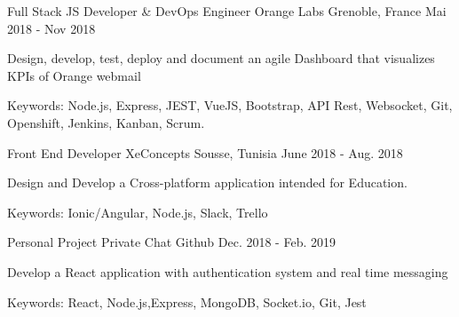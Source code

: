 

\begin{cventries}

  \cventry
    {Full Stack JS Developer \& DevOps Engineer} %
    {Orange Labs} %
    {Grenoble, France} %
    {Mai 2018 - Nov 2018} %
    {
      \begin{cvitems} %
        \item {Design, develop, test, deploy and document an agile Dashboard that visualizes KPIs of Orange webmail}
        \item {Keywords: Node.js, Express, JEST, VueJS, Bootstrap, API Rest, Websocket, Git, Openshift, Jenkins, Kanban, Scrum.}
      \end{cvitems}
    }

  \cventry
    {Front End Developer} %
    {XeConcepts} %
    {Sousse, Tunisia} %
    {June 2018 - Aug. 2018} %
    {
      \begin{cvitems} %
        \item {Design and Develop a Cross-platform application intended for Education.}
        \item {Keywords: Ionic/Angular, Node.js, Slack, Trello}
      \end{cvitems}
    }

  \cventry
    {Personal Project} %
    {Private Chat} %
    {Github} %
    {Dec. 2018 - Feb. 2019} %
    {
      \begin{cvitems} %
        \item {Develop a React application with authentication system and real time messaging   }
        \item {Keywords: React, Node.js,Express, MongoDB, Socket.io, Git, Jest  }
      \end{cvitems}
    }


\end{cventries}
